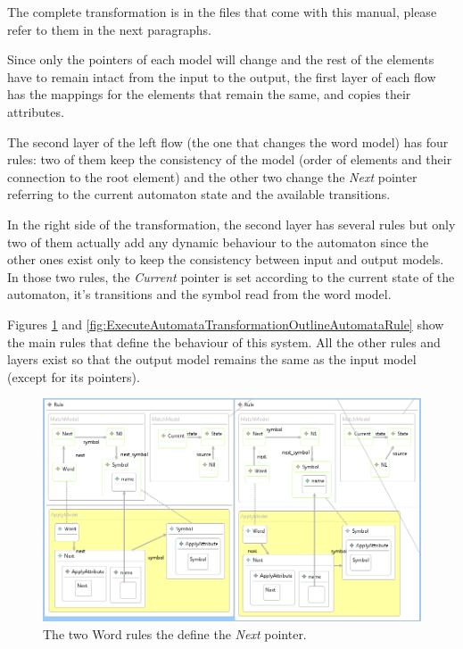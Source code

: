 The complete transformation is in the files that come with this manual, please refer to them in the next paragraphs.

Since only the pointers of each model will change and the rest of the elements have to remain intact from the input to the output, the first layer of each flow has the mappings for the elements that remain the same, and copies their attributes.

The second layer of the left flow (the one that changes the word model) has four rules: two of them keep the consistency of the model (order of elements and their connection to the root element) and the other two change the \emph{Next} pointer referring to the current automaton state and the available transitions.

In the right side of the transformation, the second layer has several rules but only two of them actually add any dynamic behaviour to the automaton since the other ones exist only to keep the consistency between input and output models. In those two rules, the \emph{Current} pointer is set according to the current state of the automaton, it's transitions and the symbol read from the word model.

Figures \ref{fig:ExecuteAutomataTransformationOutlineWordRule} and \ref{fig:ExecuteAutomataTransformationOutlineAutomataRule} show the main rules that define the behaviour of this system. All the other rules and layers exist so that the output model remains the same as the input model (except for its pointers).

\begin{figure}[h]
\begin{center}
  \includegraphics[width=\textwidth]{imgs/ExecuteAutomataTransformationOutlineWordRule.png}
  \caption{The two Word rules the define the \emph{Next} pointer.}
  \label{fig:ExecuteAutomataTransformationOutlineWordRule}
\end{center}
\end{figure}

